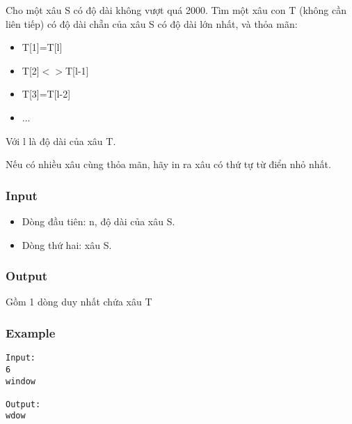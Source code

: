 



   Cho một xâu S có độ dài không vượt quá 2000. Tìm một xâu con T (không cần liên tiếp) có độ dài chẵn của xâu S có độ dài lớn nhất, và thỏa mãn:  
\begin{itemize}
	\item     T[1]=T[l]   
	\item     T[2]$<$$>$T[l-1]   
	\item     T[3]=T[l-2]   
	\item     ...   
\end{itemize}

   Với l là độ dài của xâu T.  

   Nếu có nhiều xâu cùng thỏa mãn, hãy in ra xâu có thứ tự từ điển nhỏ nhất.  

\subsubsection{   Input  }
\begin{itemize}
	\item     Dòng đầu tiên: n, độ dài của xâu S.   
	\item     Dòng thứ hai: xâu S.   
\end{itemize}

\subsubsection{   Output  }

   Gồm 1 dòng duy nhất chứa xâu T  

\subsubsection{   Example  }
\begin{verbatim}
Input:
6
window

Output:
wdow
\end{verbatim}